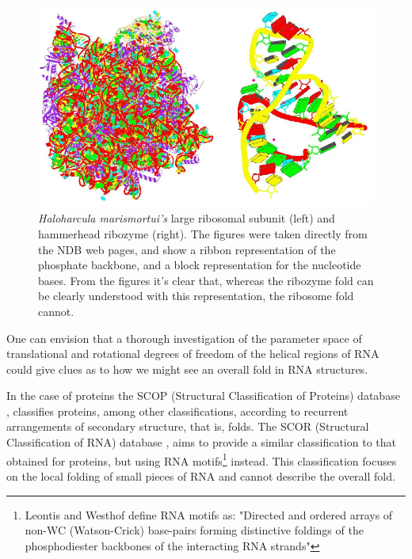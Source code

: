 \begin{figure}[t]
\centering
\includegraphics[scale=0.5]{Chapter1/ribosome_ribozyme.png}
\caption{\textit{Haloharcula marismortui's} large ribosomal subunit
(left) and hammerhead ribozyme (right).%
 The figures were taken
directly from the NDB web pages, and show a ribbon
representation of the phosphate backbone, and a block representation
for the nucleotide bases. From the figures it's clear that, whereas the
ribozyme fold can be clearly understood with this representation, the
ribosome fold cannot.}
\end{figure}
%
One can envision that a
thorough investigation of the parameter space of translational and
rotational degrees of freedom of the helical regions of RNA could
give clues as to how we might see an overall fold in RNA structures.

In the case of proteins the SCOP (Structural Classification of
Proteins) database \cite{andreeva2004}, classifies proteins, among
other classifications, according to recurrent arrangements of
secondary structure, that is, folds. The SCOR (Structural
Classification of RNA) database \cite{klosterman2002,
klosterman2004}, aims to provide a similar classification to that
obtained for proteins, but using RNA motifs\footnote{Leontis and
Westhof \cite{leontis2003} define RNA motifs as: "Directed and
ordered arrays of non-WC (Watson-Crick) base-pairs forming
distinctive foldings of the phosphodiester backbones of the
interacting RNA strands"} instead. This classification focuses on the
local folding of small pieces of RNA and cannot
describe the overall fold.


